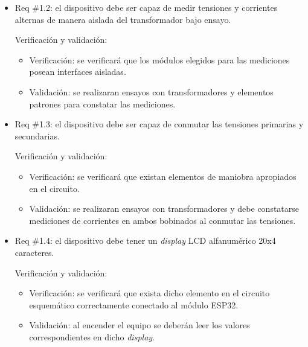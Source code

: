 \documentclass[11pt]{charter}
\begin{document}
\begin{itemize} 
\item Req \#1.2: el dispositivo debe ser capaz de medir tensiones y corrientes alternas de manera aislada del transformador bajo ensayo.

Verificación y validación:

\begin{itemize}
\item Verificación: se verificará que los módulos elegidos para las mediciones posean interfaces aisladas.
\item Validación: se realizaran ensayos con transformadores y elementos patrones para constatar las mediciones.  
\end{itemize}

\end{itemize}

\begin{itemize} 
\item Req \#1.3: el dispositivo debe ser capaz de conmutar las tensiones primarias y secundarias.

Verificación y validación:

\begin{itemize}
\item Verificación: se verificará que existan elementos de maniobra apropiados en el circuito.
\item Validación: se realizaran ensayos con transformadores y debe constatarse mediciones de corrientes en ambos bobinados al conmutar las tensiones.  
\end{itemize}

\end{itemize}

\begin{itemize} 
\item Req \#1.4: el dispositivo debe tener un \textit{display} LCD alfanumérico 20x4 caracteres.

Verificación y validación:

\begin{itemize}
\item Verificación: se verificará que exista dicho elemento en el circuito esquemático correctamente conectado al módulo ESP32.
\item Validación: al encender el equipo se deberán leer los valores correspondientes en dicho \textit{display}.  
\end{itemize}

\end{itemize}
\end{document}
